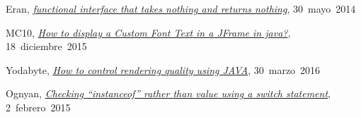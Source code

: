 Eran,
\href{https://stackoverflow.com/a/23958916}{\textit{functional interface that takes nothing and returns nothing}},
\mbox{30 mayo 2014}

MC10,
\href{https://stackoverflow.com/a/34347830}{\textit{How to display a Custom Font Text in a JFrame in java?}},
\mbox{18 diciembre 2015}

Yodabyte,
\href{https://stackoverflow.com/a/36316937}{\textit{How to control rendering quality using JAVA}},
\mbox{30 marzo 2016}

Ognyan,
\href{https://softwareengineering.stackexchange.com/a/271877}{\textit{Checking “instanceof” rather than value using a switch statement}},
\mbox{2 febrero 2015}